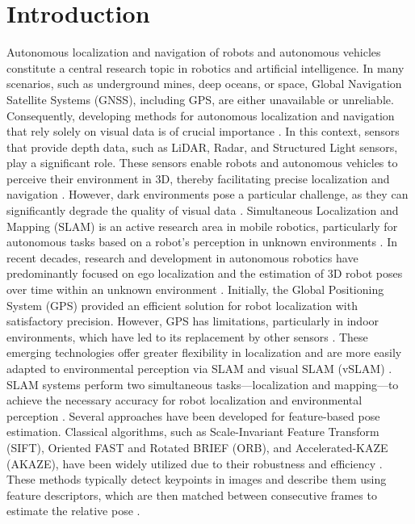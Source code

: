 \documentclass[conference, a4paper]{IEEEtran}
\begin{document}
\section{Introduction}
Autonomous localization and navigation of robots and autonomous vehicles constitute a central research topic in robotics and artificial intelligence. In many scenarios, such as underground mines, deep oceans, or space, Global Navigation Satellite Systems (GNSS), including GPS, are either unavailable or unreliable. Consequently, developing methods for autonomous localization and navigation that rely solely on visual data is of crucial importance \cite{springer1, springer2}.
In this context, sensors that provide depth data, such as LiDAR, Radar, and Structured Light sensors, play a significant role. These sensors enable robots and autonomous vehicles to perceive their environment in 3D, thereby facilitating precise localization and navigation \cite{springer1, springer2}. However, dark environments pose a particular challenge, as they can significantly degrade the quality of visual data \cite{springer1, springer2}.
Simultaneous Localization and Mapping (SLAM) is an active research area in mobile robotics, particularly for autonomous tasks based on a robot's perception in unknown environments \cite{arxiv1}. In recent decades, research and development in autonomous robotics have predominantly focused on ego localization and the estimation of 3D robot poses over time within an unknown environment \cite{arxiv1}. Initially, the Global Positioning System (GPS) provided an efficient solution for robot localization with satisfactory precision. However, GPS has limitations, particularly in indoor environments, which have led to its replacement by other sensors \cite{arxiv1}.
These emerging technologies offer greater flexibility in localization and are more easily adapted to environmental perception via SLAM and visual SLAM (vSLAM) \cite{arxiv1}. SLAM systems perform two simultaneous tasks—localization and mapping—to achieve the necessary accuracy for robot localization and environmental perception \cite{arxiv1}.
Several approaches have been developed for feature-based pose estimation. Classical algorithms, such as Scale-Invariant Feature Transform (SIFT), Oriented FAST and Rotated BRIEF (ORB), and Accelerated-KAZE (AKAZE), have been widely utilized due to their robustness and efficiency \cite{springer3}. These methods typically detect keypoints in images and describe them using feature descriptors, which are then matched between consecutive frames to estimate the relative pose \cite{springer3}.
\end{document}
